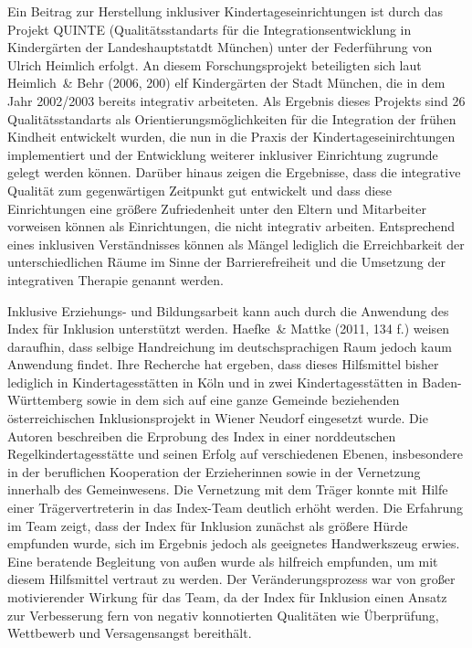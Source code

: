 Ein Beitrag zur Herstellung inklusiver Kindertageseinrichtungen ist durch das Projekt QUINTE (Qualitätsstandarts für die Integrationsentwicklung in Kindergärten der Landeshauptstatdt München) unter der Federführung von Ulrich Heimlich erfolgt. An diesem Forschungsprojekt beteiligten sich laut Heimlich~\& Behr (2006, 200) elf Kindergärten der Stadt München, die in dem Jahr 2002/2003 bereits integrativ arbeiteten. Als Ergebnis dieses Projekts sind 26 Qualitätsstandarts als Orientierungsmöglichkeiten für die Integration der frühen Kindheit entwickelt wurden, die nun in die Praxis der Kindertageseinirchtungen implementiert und der Entwicklung weiterer inklusiver Einrichtung zugrunde gelegt werden können. 
Darüber hinaus zeigen die Ergebnisse, dass die integrative Qualität zum gegenwärtigen Zeitpunkt gut entwickelt und dass diese Einrichtungen eine größere Zufriedenheit unter den Eltern und Mitarbeiter vorweisen können als Einrichtungen, die nicht integrativ arbeiten. Entsprechend eines inklusiven Verständnisses können als Mängel lediglich die Erreichbarkeit der unterschiedlichen Räume im Sinne der Barrierefreiheit und die Umsetzung der integrativen Therapie genannt werden.  

Inklusive Erziehungs- und Bildungsarbeit kann auch durch die Anwendung des Index für Inklusion unterstützt werden. Haefke~\& Mattke (2011, 134 f.) weisen daraufhin, dass selbige Handreichung im deutschsprachigen Raum jedoch kaum Anwendung findet. Ihre Recherche hat ergeben, dass dieses Hilfsmittel bisher lediglich in Kindertagesstätten in Köln und in zwei Kindertagesstätten in Baden-Württemberg sowie in dem sich auf eine ganze Gemeinde beziehenden österreichischen Inklusionsprojekt in Wiener Neudorf eingesetzt wurde. Die Autoren beschreiben die Erprobung des Index in einer norddeutschen Regelkindertagesstätte und seinen Erfolg auf verschiedenen Ebenen, insbesondere in der beruflichen Kooperation der Erzieherinnen sowie in der Vernetzung innerhalb des Gemeinwesens. Die Vernetzung mit dem Träger konnte mit Hilfe einer Trägervertreterin in das Index-Team deutlich erhöht werden. Die Erfahrung im Team zeigt, dass der Index für Inklusion zunächst als größere Hürde empfunden wurde, sich im Ergebnis jedoch als geeignetes Handwerkszeug erwies. Eine beratende Begleitung von außen wurde als hilfreich empfunden, um mit diesem Hilfsmittel vertraut zu werden. Der Veränderungsprozess war von großer motivierender Wirkung für das Team, da der Index für Inklusion einen Ansatz zur Verbesserung fern von negativ konnotierten Qualitäten wie Überprüfung, Wettbewerb und Versagensangst bereithält.

